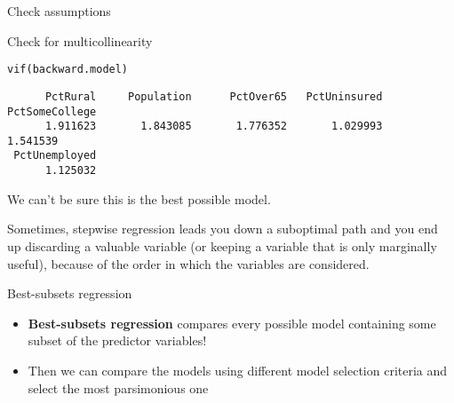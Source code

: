 \documentclass{beamer}\usepackage[]{graphicx}\usepackage[]{color}
\makeatletter
\newcommand{\hlstd}[1]{\textcolor[rgb]{1,0.894,0.769}{#1}}%
\newcommand{\hlkwd}[1]{\textcolor[rgb]{1,0.78,0.769}{#1}}%
\newenvironment{kframe}{%
 \def\at@end@of@kframe{}%
 \ifinner\ifhmode%
  \def\at@end@of@kframe{\end{minipage}}%
  \begin{minipage}{\columnwidth}%
 \fi\fi%
 \def\FrameCommand##1{\hskip\@totalleftmargin \hskip-\fboxsep
 \colorbox{shadecolor}{##1}\hskip-\fboxsep
     \hskip-\linewidth \hskip-\@totalleftmargin \hskip\columnwidth}%
 \MakeFramed {\advance\hsize-\width
   \@totalleftmargin\z@ \linewidth\hsize
   \@setminipage}}%
 {\par\unskip\endMakeFramed%
 \at@end@of@kframe}
\newenvironment{knitrout}{}{} %
\makeatother
\begin{document}
\begin{darkframes}
\begin{frame}[fragile]{Check assumptions}
\begin{knitrout}
\end{knitrout}

    \end{frame}


    \begin{frame}[fragile]{Check for multicollinearity}
      \fontsize{8}{8}\selectfont
\begin{knitrout}
\begin{kframe}
\begin{alltt}
\hlkwd{vif}\hlstd{(backward.model)}
\end{alltt}
\begin{verbatim}
      PctRural     Population      PctOver65   PctUninsured PctSomeCollege 
      1.911623       1.843085       1.776352       1.029993       1.541539 
 PctUnemployed 
      1.125032 
\end{verbatim}
\end{kframe}
\end{knitrout}
    \end{frame}

    \begin{frame}
      \begin{center}
        We can't be sure this is the best possible model. 

        \bigskip

        Sometimes, stepwise regression leads you down a suboptimal path and you end up discarding a valuable variable (or keeping a variable that is only marginally useful), because of the order in which the variables are considered.
      \end{center}
    \end{frame}

    \begin{frame}{Best-subsets regression}
      \begin{itemize}[<+->]
        \item \textbf{Best-subsets regression} compares every possible model containing some subset of the predictor variables!
        \item Then we can compare the models using different model selection criteria and select the most parsimonious one
      \end{itemize}
    \end{frame}


\end{darkframes}
\end{document}
